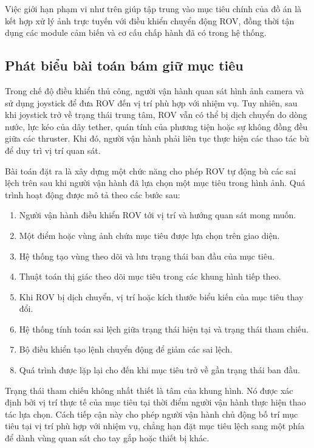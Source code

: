 \documentclass[../DoAn.tex]{subfiles}
\begin{document}
Việc giới hạn phạm vi như trên giúp tập trung vào mục tiêu chính của đồ án là kết hợp xử lý ảnh trực tuyến với điều khiển chuyển động ROV, đồng thời tận dụng các module cảm biến và cơ cấu chấp hành đã có trong hệ thống.

\subsection{Phát biểu bài toán bám giữ mục tiêu}

Trong chế độ điều khiển thủ công, người vận hành quan sát hình ảnh camera và sử dụng joystick để đưa ROV đến vị trí phù hợp với nhiệm vụ. Tuy nhiên, sau khi joystick trở về trạng thái trung tâm, ROV vẫn có thể bị dịch chuyển do dòng nước, lực kéo của dây tether, quán tính của phương tiện hoặc sự không đồng đều giữa các thruster. Khi đó, người vận hành phải liên tục thực hiện các thao tác bù để duy trì vị trí quan sát.

Bài toán đặt ra là xây dựng một chức năng cho phép ROV tự động bù các sai lệch trên sau khi người vận hành đã lựa chọn một mục tiêu trong hình ảnh. Quá trình hoạt động được mô tả theo các bước sau:
\begin{enumerate}
    \item Người vận hành điều khiển ROV tới vị trí và hướng quan sát mong muốn.
    \item Một điểm hoặc vùng ảnh chứa mục tiêu được lựa chọn trên giao diện.
    \item Hệ thống tạo vùng theo dõi và lưu trạng thái ban đầu của mục tiêu.
    \item Thuật toán thị giác theo dõi mục tiêu trong các khung hình tiếp theo.
    \item Khi ROV bị dịch chuyển, vị trí hoặc kích thước biểu kiến của mục tiêu thay đổi.
    \item Hệ thống tính toán sai lệch giữa trạng thái hiện tại và trạng thái tham chiếu.
    \item Bộ điều khiển tạo lệnh chuyển động để giảm các sai lệch.
    \item Quá trình được lặp lại cho đến khi mục tiêu trở về gần trạng thái ban đầu.
\end{enumerate}

Trạng thái tham chiếu không nhất thiết là tâm của khung hình. Nó được xác định bởi vị trí thực tế của mục tiêu tại thời điểm người vận hành thực hiện thao tác lựa chọn. Cách tiếp cận này cho phép người vận hành chủ động bố trí mục tiêu tại vị trí phù hợp với nhiệm vụ, chẳng hạn đặt mục tiêu lệch sang một phía để dành vùng quan sát cho tay gắp hoặc thiết bị khác.
\end{document}
